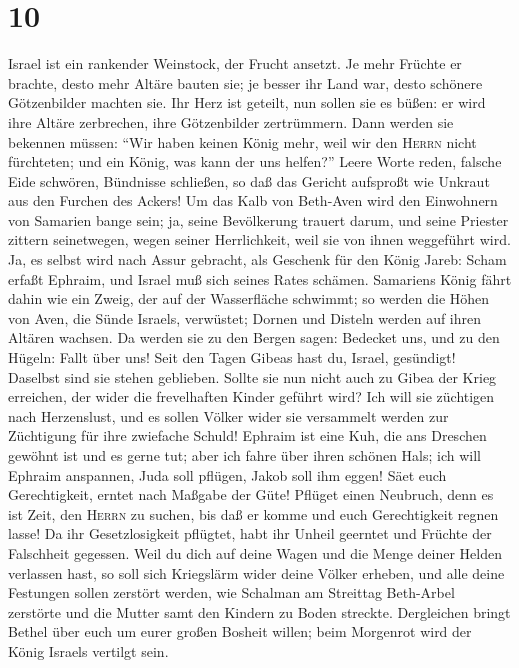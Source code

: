 \hypertarget{section-9}{%
\section{10}\label{section-9}}

 Israel ist ein rankender Weinstock, der Frucht ansetzt.
Je mehr Früchte er brachte, desto mehr Altäre bauten sie; je besser ihr
Land war, desto schönere Götzenbilder machten sie.  Ihr
Herz ist geteilt, nun sollen sie es büßen: er wird ihre Altäre
zerbrechen, ihre Götzenbilder zertrümmern.  Dann werden
sie bekennen müssen: ``Wir haben keinen König mehr, weil wir den
\textsc{Herrn} nicht fürchteten; und ein König, was kann der uns
helfen?''  Leere Worte reden, falsche Eide schwören,
Bündnisse schließen, so daß das Gericht aufsproßt wie Unkraut aus den
Furchen des Ackers!  Um das Kalb von Beth-Aven wird den
Einwohnern von Samarien bange sein; ja, seine Bevölkerung trauert darum,
und seine Priester zittern seinetwegen, wegen seiner Herrlichkeit, weil
sie von ihnen weggeführt wird.  Ja, es selbst wird nach
Assur gebracht, als Geschenk für den König Jareb: Scham erfaßt Ephraim,
und Israel muß sich seines Rates schämen.  Samariens König
fährt dahin wie ein Zweig, der auf der Wasserfläche schwimmt;
 so werden die Höhen von Aven, die Sünde Israels,
verwüstet; Dornen und Disteln werden auf ihren Altären wachsen. Da
werden sie zu den Bergen sagen: Bedecket uns, und zu den Hügeln: Fallt
über uns!  Seit den Tagen Gibeas hast du, Israel,
gesündigt! Daselbst sind sie stehen geblieben. Sollte sie nun nicht auch
zu Gibea der Krieg erreichen, der wider die frevelhaften Kinder geführt
wird?  Ich will sie züchtigen nach Herzenslust, und es
sollen Völker wider sie versammelt werden zur Züchtigung für ihre
zwiefache Schuld!  Ephraim ist eine Kuh, die ans Dreschen
gewöhnt ist und es gerne tut; aber ich fahre über ihren schönen Hals;
ich will Ephraim anspannen, Juda soll pflügen, Jakob soll ihm eggen!
 Säet euch Gerechtigkeit, erntet nach Maßgabe der Güte!
Pflüget einen Neubruch, denn es ist Zeit, den \textsc{Herrn} zu suchen,
bis daß er komme und euch Gerechtigkeit regnen lasse!  Da
ihr Gesetzlosigkeit pflügtet, habt ihr Unheil geerntet und Früchte der
Falschheit gegessen. Weil du dich auf deine Wagen und die Menge deiner
Helden verlassen hast,  so soll sich Kriegslärm wider
deine Völker erheben, und alle deine Festungen sollen zerstört werden,
wie Schalman am Streittag Beth-Arbel zerstörte und die Mutter samt den
Kindern zu Boden streckte.  Dergleichen bringt Bethel
über euch um eurer großen Bosheit willen; beim Morgenrot wird der König
Israels vertilgt sein.

